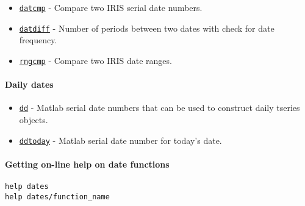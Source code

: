 \begin{itemize}
\itemsep1pt\parskip0pt
\item
  \href{dates/datcmp}{\texttt{datcmp}} - Compare two IRIS serial date
  numbers.
\item
  \href{dates/datdiff}{\texttt{datdiff}} - Number of periods between two
  dates with check for date frequency.
\item
  \href{dates/rngcmp}{\texttt{rngcmp}} - Compare two IRIS date ranges.
\end{itemize}

\paragraph{Daily dates}\label{daily-dates}

\begin{itemize}
\itemsep1pt\parskip0pt
\item
  \href{dates/dd}{\texttt{dd}} - Matlab serial date numbers that can be
  used to construct daily tseries objects.
\item
  \href{dates/ddtoday}{\texttt{ddtoday}} - Matlab serial date number for
  today's date.
\end{itemize}

\paragraph{Getting on-line help on date
functions}\label{getting-on-line-help-on-date-functions}

\begin{verbatim}
help dates
help dates/function_name
\end{verbatim}



